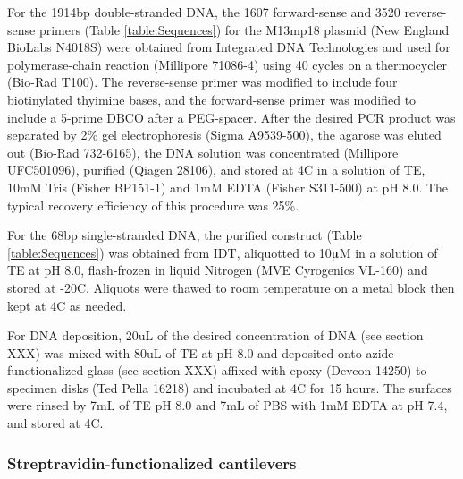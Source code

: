 \documentclass[%
  aip,12pt,tightenlines,
  amsthm,
 amsmath,amssymb
]{article}
\newcommand{\tRef}[1]{Table \ref{table:#1}}
\newcommand{\sLabel}[1]{\label{section:#1}}
\newcommand{\firstp}[0]{}
\newcommand{\pl}[0]{\vspace{6pt}}
\newcommand{\supply}[2]{(#1 #2)}
\newcommand{\degreeC}[0]{\degree{}C}
\begin{document}
\firstp For the 1914bp double-stranded DNA, the 1607 forward-sense and 3520 reverse-sense primers (\tRef{Sequences}) for the M13mp18 plasmid \supply{New England BioLabs}{N4018S} were obtained from Integrated DNA Technologies  and used for polymerase-chain reaction \supply{Millipore}{71086-4} using 40 cycles on a thermocycler \supply{Bio-Rad}{T100}. The reverse-sense primer was modified to include four biotinylated thyimine bases, and the forward-sense primer was modified to include a 5-prime DBCO after a PEG-spacer. After the desired PCR product was separated by 2\% gel electrophoresis \supply{Sigma}{A9539-500}, the agarose was eluted out \supply{Bio-Rad}{732-6165}, the DNA solution was concentrated \supply{Millipore}{UFC501096}, purified \supply{Qiagen}{28106}, and stored at 4\degreeC{} in a solution of TE, 10mM Tris \supply{Fisher}{BP151-1} and 1mM EDTA \supply{Fisher}{S311-500} at pH 8.0. The typical recovery efficiency of this procedure was 25\%. \pl 

For the 68bp single-stranded DNA, the purified construct (\tRef{Sequences}) was obtained from IDT, aliquotted to 10$\muup$M in a solution of TE at pH 8.0, flash-frozen in liquid Nitrogen \supply{MVE Cyrogenics}{VL-160} and stored at -20\degreeC{}. Aliquots were thawed to room temperature on a metal block then kept at 4\degreeC{} as needed. \pl 

For DNA deposition, 20uL of the desired concentration of DNA (see section XXX) was mixed with 80uL of TE at pH 8.0 and deposited onto azide-functionalized glass (see section XXX) affixed with epoxy \supply{Devcon}{14250} to specimen disks \supply{Ted Pella}{16218} and incubated at 4C for 15 hours. The surfaces were rinsed by 7mL of TE pH 8.0 and 7mL of PBS with 1mM EDTA at pH 7.4, and stored at 4\degreeC{}. 

\subsubsection{\sLabel{Cantilevers}Streptravidin-functionalized cantilevers}
\end{document}
